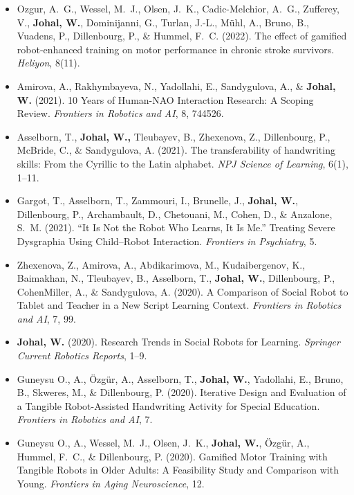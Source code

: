 \begin{itemize}[nosep]
    \item Ozgur, A.\ G., Wessel, M.\ J., Olsen, J.\ K., Cadic-Melchior, A.\ G., Zufferey, V., \textbf{Johal, W.}, Dominijanni, G., Turlan, J.-L., Mühl, A., Bruno, B., Vuadens, P., Dillenbourg, P., \& Hummel, F.\ C. (2022). The effect of gamified robot-enhanced training on motor performance in chronic stroke survivors. \textit{Heliyon}, 8(11).

    \item Amirova, A., Rakhymbayeva, N., Yadollahi, E., Sandygulova, A., \& \textbf{Johal, W.} (2021). 10 Years of Human-NAO Interaction Research: A Scoping Review. \textit{Frontiers in Robotics and AI}, 8, 744526.

    \item Asselborn, T., \textbf{Johal, W.,} Tleubayev, B., Zhexenova, Z., Dillenbourg, P., McBride, C., \& Sandygulova, A. (2021). The transferability of handwriting skills: From the Cyrillic to the Latin alphabet. \textit{NPJ Science of Learning}, 6(1), 1--11.

    \item Gargot, T., Asselborn, T., Zammouri, I., Brunelle, J., \textbf{Johal, W.}, Dillenbourg, P., Archambault, D., Chetouani, M., Cohen, D., \& Anzalone, S.\ M. (2021). ``It Is Not the Robot Who Learns, It Is Me.'' Treating Severe Dysgraphia Using Child--Robot Interaction. \textit{Frontiers in Psychiatry}, 5.

    \item Zhexenova, Z., Amirova, A., Abdikarimova, M., Kudaibergenov, K., Baimakhan, N., Tleubayev, B., Asselborn, T., \textbf{Johal, W.}, Dillenbourg, P., CohenMiller, A., \& Sandygulova, A. (2020). A Comparison of Social Robot to Tablet and Teacher in a New Script Learning Context. \textit{Frontiers in Robotics and AI}, 7, 99.

    \item \textbf{Johal, W.} (2020). Research Trends in Social Robots for Learning. \textit{Springer Current Robotics Reports}, 1--9.

    \item Guneysu O., A., Özgür, A., Asselborn, T., \textbf{Johal, W.}, Yadollahi, E., Bruno, B., Skweres, M., \& Dillenbourg, P. (2020). Iterative Design and Evaluation of a Tangible Robot-Assisted Handwriting Activity for Special Education. \textit{Frontiers in Robotics and AI}, 7.

    \item Guneysu O., A., Wessel, M.\ J., Olsen, J.\ K., \textbf{Johal, W.}, Özgür, A., Hummel, F.\ C., \& Dillenbourg, P. (2020). Gamified Motor Training with Tangible Robots in Older Adults: A Feasibility Study and Comparison with Young. \textit{Frontiers in Aging Neuroscience}, 12.


\end{itemize}
